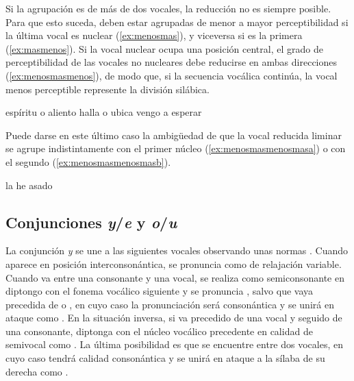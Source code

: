Si la agrupación es de más de dos vocales, la reducción no es siempre posible. Para que esto suceda, deben estar agrupadas de menor a mayor perceptibilidad si la última vocal es nuclear (\ref{ex:menosmas}), y viceversa si es la primera (\ref{ex:masmenos}). Si la vocal nuclear ocupa una posición central, el grado de perceptibilidad de las vocales no nucleares debe reducirse en ambas direcciones  (\ref{ex:menosmasmenos}), de modo que, si la secuencia vocálica continúa, la vocal menos perceptible represente la división silábica.

\begin{exe}
	\ex\label{ex:menosmas}\textlangle{}espíritu o aliento\textrangle{} 
	\ex\label{ex:masmenos}\textlangle{}halla o ubica\textrangle{} 
	\ex\label{ex:menosmasmenos}\textlangle{}vengo a esperar\textrangle{} 
\end{exe}

Puede darse en este último caso la ambigüedad de que la vocal reducida liminar se agrupe indistintamente con el primer núcleo (\ref{ex:menosmasmenosmasa}) o con el segundo (\ref{ex:menosmasmenosmasb}).
\begin{exe}
	\ex\textlangle{}la he asado\textrangle{}
	\begin{xlist}
		\ex\label{ex:menosmasmenosmasa}
		\ex\label{ex:menosmasmenosmasb}
	\end{xlist}
\end{exe}

\subsection{Conjunciones \textit{y}/\textit{e} y \textit{o}/\textit{u}}\label{sec:conj}
La conjunción \textit{y} se une a las siguientes vocales observando unas normas \parencites[59]{canellada1987}[49]{navarrotomas2004}. Cuando aparece en posición interconsonántica, se pronuncia como  de relajación variable. Cuando va entre una consonante y una vocal, se realiza como semiconsonante en diptongo con el fonema vocálico siguiente y se pronuncia , salvo que vaya precedida de  o , en cuyo caso la pronunciación será consonántica y se unirá en ataque como . En la situación inversa, si va precedido de una vocal y seguido de una consonante, diptonga con el núcleo vocálico precedente en calidad de semivocal como . La última posibilidad es que se encuentre entre dos vocales, en cuyo caso tendrá calidad consonántica y se unirá en ataque a la sílaba de su derecha como .

